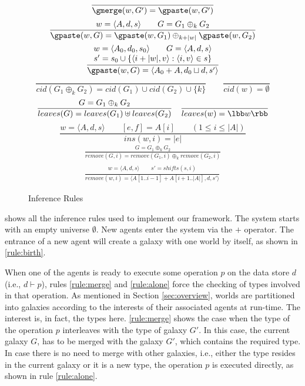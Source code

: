 \begin{figure}
\begin{minipage}{0.49\textwidth}
\begin{gather*}
    \frac{}{\gmerge(w,G')=\gpaste(w,G')}
  \end{gather*}
  \begin{gather*}
    \frac
      {w=\langle A,d,s\rangle
      \qquad
      G=G_1\oplus_k G_2}
      {\gpaste(w,G)=\gpaste(w,G_1)\oplus_{k+|w|}\gpaste(w,G_2)}
  \\
    \frac
      {\begin{matrix}
        w=\langle A_0,d_0,s_0\rangle \qquad
        G=\langle A,d,s\rangle \\
        s'=s_0\cup\{\langle i+|w|,v\rangle:\langle i,v\rangle\in s\}
      \end{matrix}}
      {\gpaste(w,G)=\langle A_0+A,d_0\sqcup d,s'\rangle}
  \end{gather*}
  \[
    \frac{}{cid(G_1\oplus_k G_2)=cid(G_1)\cup cid(G_2)\cup\{k\}} \qquad
    \frac{}{cid(w)=\emptyset}
  \]
  \[
    \frac{G=G_1\oplus_k G_2}{leaves(G)=leaves(G_1)\uplus leaves(G_2)}
    \quad
    \frac{}{leaves(w)=\lbb w\rbb}
  \]
  \[
    \frac{w=\langle A,d,s\rangle \qquad [e,f]=A[i] \qquad (1\le i\le |A|)}
    {ins(w,i)=|e|}
  \]
  \begin{gather*}
    \frac{G=G_1\oplus_k G_2}
    {remove(G,i)=remove(G_1,i)\oplus_k remove(G_2,i)}
  \\
    \frac{\begin{matrix}
        w=\langle A,d,s\rangle \qquad
        s'=shifts(s,i)
    \end{matrix}}
    {remove(w,i)=\langle A[1..i-1]+A[i+1..|A|],d,s'\rangle}
  \end{gather*}
\end{minipage}
%
  \caption{Inference Rules}
  \label{fig:rules}
\end{figure}

 shows all the inference rules used to implement our framework.
The system starts with an empty universe $\emptyset$.
New agents enter the system via the $+$ operator.
The entrance of a new agent will create a galaxy with one world by itself,
as shown in \ref{rule:birth}.

When one of the agents is ready to execute some operation $p$
on the data store $d$ (i.e., $d\vdash p$),
rules \ref{rule:merge} and \ref{rule:alone} force the checking of
types involved in that operation.
As mentioned in Section \ref{sec:overview},
worlds are partitioned into galaxies according
to the interests of their associated agents at run-time.
The interest is, in fact, the types here.
\ref{rule:merge} shows the case when the type of the operation $p$
interleaves with the type of galaxy $G'$.
In this case, the current galaxy $G$, has to be merged with the galaxy $G'$,
which contains the required type.
In case there is no need to merge with other galaxies,
i.e., either the type resides in the current galaxy or it is a new type,
the operation $p$ is executed directly,
as shown in rule \ref{rule:alone}.

